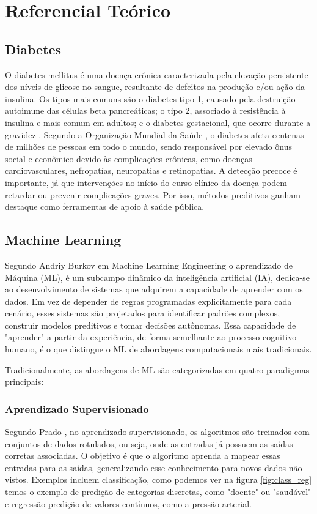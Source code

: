 \chapter{Referencial Teórico}
\section{Diabetes}
O diabetes mellitus é uma doença crônica caracterizada pela elevação persistente dos níveis de glicose no sangue, resultante de defeitos na produção e/ou ação da insulina. Os tipos mais comuns são o diabetes tipo 1, causado pela destruição autoimune das células beta pancreáticas; o tipo 2, associado à resistência à insulina e mais comum em adultos; e o diabetes gestacional, que ocorre durante a gravidez \cite{BRASIL2022}. Segundo a Organização Mundial da Saúde \cite{WHO2021}, o diabetes afeta centenas de milhões de pessoas em todo o mundo, sendo responsável por elevado ônus social e econômico devido às complicações crônicas, como doenças cardiovasculares, nefropatías, neuropatias e retinopatias. A detecção precoce é importante, já que intervenções no início do curso clínico da doença podem retardar ou prevenir complicações graves. Por isso, métodos preditivos ganham destaque como ferramentas de apoio à saúde pública.

\section{Machine Learning}
Segundo Andriy Burkov\cite{Burkov2020} em Machine Learning Engineering o aprendizado de Máquina (ML), é um subcampo dinâmico da inteligência artificial (IA), dedica-se ao desenvolvimento de sistemas que adquirem a capacidade de aprender com os dados. Em vez de depender de regras programadas explicitamente para cada cenário, esses sistemas são projetados para identificar padrões complexos, construir modelos preditivos e tomar decisões autônomas. Essa capacidade de "aprender" a partir da experiência, de forma semelhante ao processo cognitivo humano, é o que distingue o ML de abordagens computacionais mais tradicionais.

Tradicionalmente, as abordagens de ML são categorizadas em quatro paradigmas principais:

\subsection{Aprendizado Supervisionado}
Segundo Prado \cite{Prado2001}, no aprendizado supervisionado, os algoritmos são treinados com conjuntos de dados rotulados, ou seja, onde as entradas já possuem as saídas corretas associadas. O objetivo é que o algoritmo aprenda a mapear essas entradas para as saídas, generalizando esse conhecimento para novos dados não vistos. Exemplos incluem classificação, como podemos ver na figura \ref{fig:class_reg} temos o exemplo de predição de categorias discretas, como "doente" ou "saudável" e regressão predição de valores contínuos, como a pressão arterial. \cite{Feitosa2024}

